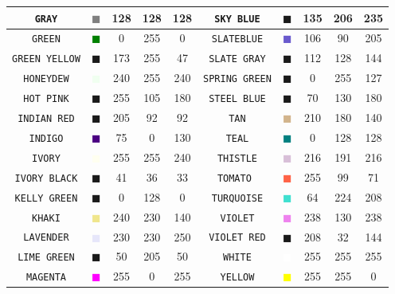 \documentclass[11pt]{book}
\newcommand{\ct}{\tt\small}
\begin{document}
\begin{table}[p]
\begin{center}
\begin{tabular}{|c|c|c|c|c|c||c|c|c|c|}
{\ct GRAY} & \textcolor{GRAY} {$\blacksquare$} & 128& 128& 128& {\ct SKY BLUE} &  \textcolor{SKY BLUE} {$\blacksquare$} & 135& 206& 235  \\ \hline
{\ct GREEN} & \textcolor{GREEN} {$\blacksquare$} & 0& 255& 0& {\ct SLATEBLUE} &  \textcolor{SLATEBLUE} {$\blacksquare$} & 106& 90& 205  \\ \hline
{\ct GREEN YELLOW} & \textcolor{GREEN YELLOW} {$\blacksquare$} & 173& 255& 47& {\ct SLATE GRAY} &  \textcolor{SLATE GRAY} {$\blacksquare$} & 112& 128& 144  \\ \hline
{\ct HONEYDEW} & \textcolor{HONEYDEW} {$\blacksquare$} & 240& 255& 240& {\ct SPRING GREEN} &  \textcolor{SPRING GREEN} {$\blacksquare$} & 0& 255& 127  \\ \hline
{\ct HOT PINK} & \textcolor{HOT PINK} {$\blacksquare$} & 255& 105& 180& {\ct STEEL BLUE} &  \textcolor{STEEL BLUE} {$\blacksquare$} & 70& 130& 180  \\ \hline
{\ct INDIAN RED} & \textcolor{INDIAN RED} {$\blacksquare$} & 205& 92& 92& {\ct TAN} &  \textcolor{TAN} {$\blacksquare$} & 210& 180& 140  \\ \hline
{\ct INDIGO} & \textcolor{INDIGO} {$\blacksquare$} & 75& 0& 130& {\ct TEAL} &  \textcolor{TEAL} {$\blacksquare$} & 0& 128& 128  \\ \hline
{\ct IVORY} & \textcolor{IVORY} {$\blacksquare$} & 255& 255& 240& {\ct THISTLE} &  \textcolor{THISTLE} {$\blacksquare$} & 216& 191& 216  \\ \hline
{\ct IVORY BLACK} & \textcolor{IVORY BLACK} {$\blacksquare$} & 41& 36& 33& {\ct TOMATO } &  \textcolor{TOMATO } {$\blacksquare$} & 255& 99& 71  \\ \hline
{\ct KELLY GREEN} & \textcolor{KELLY GREEN} {$\blacksquare$} & 0& 128& 0& {\ct TURQUOISE} &  \textcolor{TURQUOISE} {$\blacksquare$} & 64& 224& 208  \\ \hline
{\ct KHAKI} & \textcolor{KHAKI} {$\blacksquare$} & 240& 230& 140& {\ct VIOLET} &  \textcolor{VIOLET} {$\blacksquare$} & 238& 130& 238  \\ \hline
{\ct LAVENDER} & \textcolor{LAVENDER} {$\blacksquare$} & 230& 230& 250& {\ct VIOLET RED} &  \textcolor{VIOLET RED} {$\blacksquare$} & 208& 32& 144  \\ \hline
{\ct LIME GREEN} & \textcolor{LIME GREEN} {$\blacksquare$} & 50& 205& 50& {\ct WHITE} &  \textcolor{WHITE} {$\blacksquare$} & 255& 255& 255  \\ \hline
{\ct MAGENTA} & \textcolor{MAGENTA} {$\blacksquare$} & 255& 0& 255& {\ct YELLOW} &  \textcolor{YELLOW} {$\blacksquare$} & 255& 255& 0  \\ \hline
\hline
\end{tabular}
\end{center}
\end{table}
\end{document}
